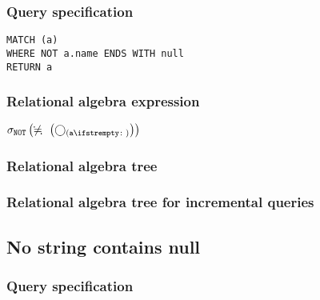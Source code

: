 \subsubsection*{Query specification}

\begin{lstlisting}
MATCH (a)
WHERE NOT a.name ENDS WITH null
RETURN a
\end{lstlisting}

\subsubsection*{Relational algebra expression}

$\selection{\mathtt{NOT}} \left(\alldifferent{} \left(\getvertices{a}{}\right)\right)$

\subsubsection*{Relational algebra tree}


\subsubsection*{Relational algebra tree for incremental queries}


\subsection{No string contains null}

\subsubsection*{Query specification}

